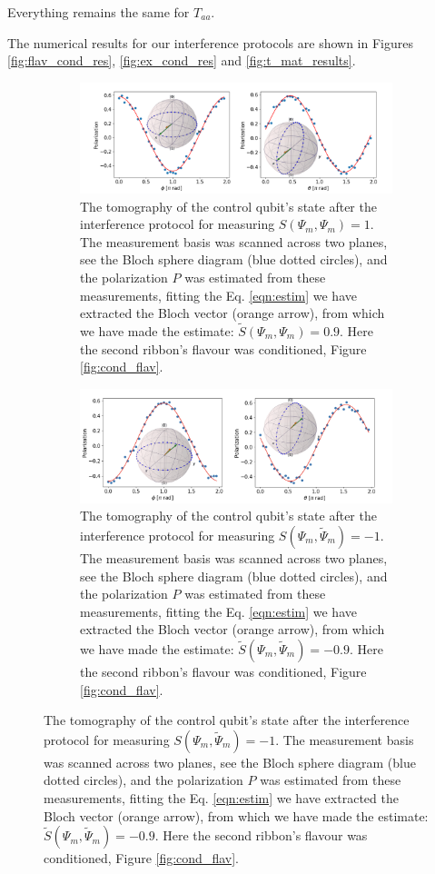 \documentclass[two column]{article}
\begin{document}
Everything remains the same for $T_{aa}$.

The numerical results for our interference protocols are shown in Figures \ref{fig:flav_cond_res}, \ref{fig:ex_cond_res} and \ref{fig:t_mat_results}.

\begin{figure}
    \centering
    \begin{subfigure}{\textwidth}
        \centering
        \includegraphics[width=0.85\linewidth]{Figures/flav_s_plus.pdf}
        \caption{The tomography of the control qubit's state after the interference protocol for measuring $S(\Psi_m, \Psi_m) = 1$. The measurement basis was scanned across two planes, see the Bloch sphere diagram (blue dotted circles), and the polarization $P$ was estimated from these measurements, fitting the Eq. \ref{eqn:estim} we have extracted the Bloch vector (orange arrow), from which we have made the estimate: $\tilde{S}(\Psi_m, \Psi_m) = 0.9$. Here the second ribbon's flavour was conditioned, Figure \ref{fig:cond_flav}.}
        \label{fig:flav_cond_res_plus}
    \end{subfigure}
        \begin{subfigure}{\textwidth}
        \centering
        \includegraphics[width=0.8\linewidth]{Figures/flav_s_minus.pdf}
        \caption{The tomography of the control qubit's state after the interference protocol for measuring $S(\Psi_m, \tilde{\Psi}_m) = -1$. The measurement basis was scanned across two planes, see the Bloch sphere diagram (blue dotted circles), and the polarization $P$ was estimated from these measurements, fitting the Eq. \ref{eqn:estim} we have extracted the Bloch vector (orange arrow), from which we have made the estimate: $\tilde{S}(\Psi_m, \tilde{\Psi}_m) = -0.9$. Here the second ribbon's flavour was conditioned, Figure \ref{fig:cond_flav}.}

\end{subfigure}
\end{figure}
\end{document}
